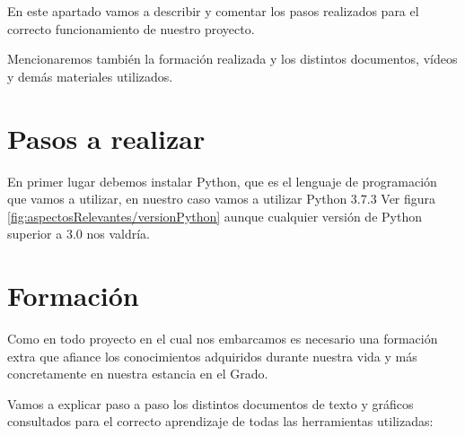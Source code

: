 

En este apartado vamos a describir y comentar los pasos realizados para el correcto funcionamiento de nuestro proyecto.

Mencionaremos también la formación realizada y los distintos documentos, vídeos y demás materiales utilizados.


\section{Pasos a realizar}

En primer lugar debemos instalar Python, que es el lenguaje de programación que vamos a utilizar, en nuestro caso vamos a utilizar Python 3.7.3 Ver figura \ref{fig:aspectosRelevantes/versionPython} aunque cualquier versión de Python superior a 3.0 nos valdría.


\section{Formación}

Como en todo proyecto en el cual nos embarcamos es necesario una formación extra que afiance los conocimientos adquiridos durante nuestra vida y más concretamente en nuestra estancia en el Grado.

Vamos a explicar paso a paso los distintos documentos de texto y gráficos consultados para el correcto aprendizaje de todas las herramientas utilizadas:

